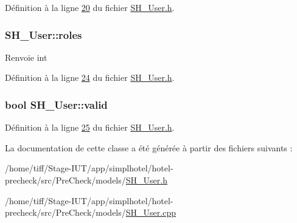 Définition à la ligne \hyperlink{SH__User_8h_source_l00020}{20} du fichier \hyperlink{SH__User_8h_source}{S\-H\-\_\-\-User.\-h}.

\hypertarget{classSH__User_af21eafacfa21aa325f7e68a065ce14de}{
\subsubsection[{roles}]{\setlength{\rightskip}{0pt plus 5cm}S\-H\-\_\-\-User\-::roles\hspace{0.3cm}{\ttfamily [read]}}}\label{classSH__User_af21eafacfa21aa325f7e68a065ce14de}
\begin{DoxyReturn}{Renvoie}
int 
\end{DoxyReturn}


Définition à la ligne \hyperlink{SH__User_8h_source_l00024}{24} du fichier \hyperlink{SH__User_8h_source}{S\-H\-\_\-\-User.\-h}.

\hypertarget{classSH__User_a91cae1175894bf2eef629405638db01c}{
\subsubsection[{valid}]{\setlength{\rightskip}{0pt plus 5cm}bool S\-H\-\_\-\-User\-::valid\hspace{0.3cm}{\ttfamily [read]}}}\label{classSH__User_a91cae1175894bf2eef629405638db01c}


Définition à la ligne \hyperlink{SH__User_8h_source_l00025}{25} du fichier \hyperlink{SH__User_8h_source}{S\-H\-\_\-\-User.\-h}.



La documentation de cette classe a été générée à partir des fichiers suivants \-:\begin{DoxyCompactItemize}
\item 
/home/tiff/\-Stage-\/\-I\-U\-T/app/simplhotel/hotel-\/precheck/src/\-Pre\-Check/models/\hyperlink{SH__User_8h}{S\-H\-\_\-\-User.\-h}\item 
/home/tiff/\-Stage-\/\-I\-U\-T/app/simplhotel/hotel-\/precheck/src/\-Pre\-Check/models/\hyperlink{SH__User_8cpp}{S\-H\-\_\-\-User.\-cpp}\end{DoxyCompactItemize}
